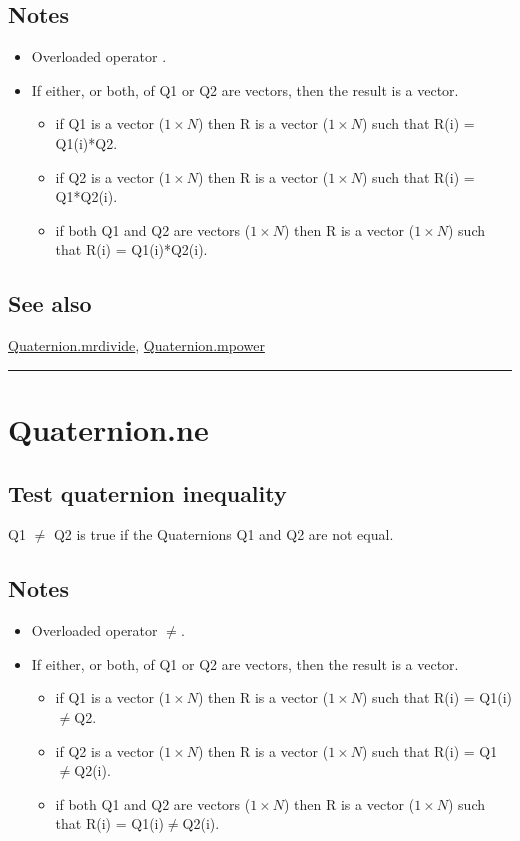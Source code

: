 \subsection*{Notes}
\begin{itemize}
  \item Overloaded operator \textquotesingle *\textquotesingle .
  \item If either, or both, of Q1 or Q2 are vectors, then the result is a vector.
\begin{itemize}
  \item if Q1 is a vector ($1 \times N$) then R is a vector ($1 \times N$) such that R(i) = Q1(i)*Q2.
  \item if Q2 is a vector ($1 \times N$) then R is a vector ($1 \times N$) such that R(i) = Q1*Q2(i).
  \item if both Q1 and Q2 are vectors ($1 \times N$) then R is a vector ($1 \times N$) such      that R(i) = Q1(i)*Q2(i).
\end{itemize}
\end{itemize}

\subsection*{See also}


\hyperlink{Quaternion.mrdivide}{\color{blue} Quaternion.mrdivide}, \hyperlink{Quaternion.mpower}{\color{blue} Quaternion.mpower}

\vspace{1.5ex}\hrule

\hypertarget{Quaternion.ne}{\section*{Quaternion.ne}}
\subsection*{Test quaternion inequality}


Q1 $\ne$ Q2 is true if the Quaternions Q1 and Q2 are not equal.


\subsection*{Notes}
\begin{itemize}
  \item Overloaded operator \textquotesingle $\ne$\textquotesingle .
  \item If either, or both, of Q1 or Q2 are vectors, then the result is a vector.
\begin{itemize}
  \item if Q1 is a vector ($1 \times N$) then R is a vector ($1 \times N$) such that R(i) = Q1(i)$\ne$Q2.
  \item if Q2 is a vector ($1 \times N$) then R is a vector ($1 \times N$) such that R(i) = Q1$\ne$Q2(i).
  \item if both Q1 and Q2 are vectors ($1 \times N$) then R is a vector ($1 \times N$) such      that R(i) = Q1(i)$\ne$Q2(i).
\end{itemize}
\end{itemize}


